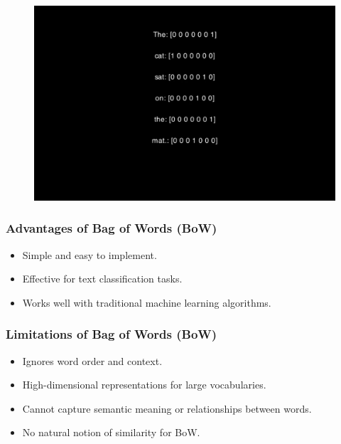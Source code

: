 \documentclass{beamer}
\begin{document}
\begin{frame}
    \begin{figure}
        \centering
        \includegraphics[width=1\textwidth,keepaspectratio]{images/ohe}
        \label{fig:ohe}
    \end{figure}
\end{frame}

\begin{frame}
    \frametitle{Advantages of Bag of Words (BoW)}
    \begin{itemize}
        \item Simple and easy to implement.
        \item Effective for text classification tasks.
        \item Works well with traditional machine learning algorithms.
    \end{itemize}
\end{frame}

\begin{frame}
    \frametitle{Limitations of Bag of Words (BoW)}
    \begin{itemize}
        \item Ignores word order and context.
        \item High-dimensional representations for large vocabularies.
        \item Cannot capture semantic meaning or relationships between words.
        \item No natural notion of similarity for BoW.
    \end{itemize}
\end{frame}
\end{document}
